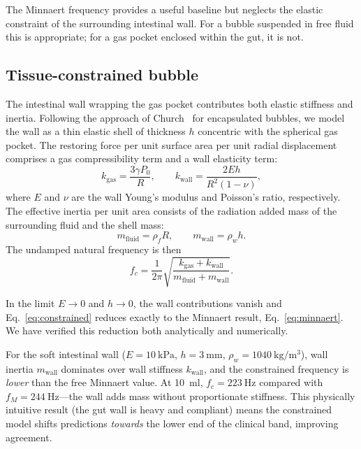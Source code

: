 \documentclass[12pt]{article}
\begin{document}
The Minnaert frequency provides a useful baseline but neglects the elastic
constraint of the surrounding intestinal wall.  For a bubble suspended in
free fluid this is appropriate; for a gas pocket enclosed within the gut, it
is not.

\subsection{Tissue-constrained bubble}
\label{sec:constrained}

The intestinal wall wrapping the gas pocket contributes both elastic
stiffness and inertia.  Following the approach of Church~\cite{Church1995}
for encapsulated bubbles, we model the wall as a thin elastic shell of
thickness $h$ concentric with the spherical gas pocket.  The restoring force
per unit surface area per unit radial displacement comprises a gas
compressibility term and a wall elasticity term:
\begin{equation}
  k_\mathrm{gas} = \frac{3\gamma P_0}{R}, \qquad
  k_\mathrm{wall} = \frac{2Eh}{R^2(1-\nu)},
  \label{eq:stiffness}
\end{equation}
where $E$ and $\nu$ are the wall Young's modulus and Poisson's ratio,
respectively.  The effective inertia per unit area consists of the radiation
added mass of the surrounding fluid and the shell mass:
\begin{equation}
  m_\mathrm{fluid} = \rho_f R, \qquad
  m_\mathrm{wall} = \rho_w h.
  \label{eq:mass}
\end{equation}
The undamped natural frequency is then
\begin{equation}
  f_c = \frac{1}{2\pi}\sqrt{\frac{k_\mathrm{gas} + k_\mathrm{wall}}
    {m_\mathrm{fluid} + m_\mathrm{wall}}}.
  \label{eq:constrained}
\end{equation}

In the limit $E \to 0$ and $h \to 0$, the wall contributions vanish and
Eq.~\eqref{eq:constrained} reduces exactly to the Minnaert result,
Eq.~\eqref{eq:minnaert}.  We have verified this reduction both analytically
and numerically.

For the soft intestinal wall ($E = \SI{10}{\kilo\pascal}$,
$h = \SI{3}{\milli\metre}$, $\rho_w = \SI{1040}{\kilogram\per\metre\cubed}$),
wall inertia $m_\mathrm{wall}$ dominates over wall stiffness
$k_\mathrm{wall}$, and the constrained frequency is \emph{lower} than the
free Minnaert value.  At \SI{10}{\milli\litre},
$f_c = \SI{223}{\hertz}$ compared with $f_M = \SI{244}{\hertz}$---the wall
adds mass without proportionate stiffness.  This physically intuitive result
(the gut wall is heavy and compliant) means the constrained model shifts
predictions \emph{towards} the lower end of the clinical band, improving
agreement.
\end{document}
